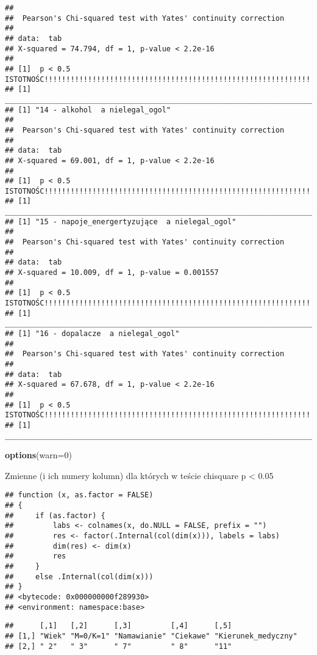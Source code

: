 \documentclass[]{article}
\newenvironment{Shaded}{\begin{snugshade}}{\end{snugshade}}
\newcommand{\KeywordTok}[1]{\textcolor[rgb]{0.13,0.29,0.53}{\textbf{#1}}}
\newcommand{\DataTypeTok}[1]{\textcolor[rgb]{0.13,0.29,0.53}{#1}}
\newcommand{\DecValTok}[1]{\textcolor[rgb]{0.00,0.00,0.81}{#1}}
\newcommand{\NormalTok}[1]{#1}
\begin{document}
\begin{verbatim}
## 
##  Pearson's Chi-squared test with Yates' continuity correction
## 
## data:  tab
## X-squared = 74.794, df = 1, p-value < 2.2e-16
## 
## [1]  p < 0.5 ISTOTNOŚC!!!!!!!!!!!!!!!!!!!!!!!!!!!!!!!!!!!!!!!!!!!!!!!!!!!!!!!!!!!!!!!!
## [1] _______________________________________________________________________________
## [1] "14 - alkohol  a nielegal_ogol"
## 
##  Pearson's Chi-squared test with Yates' continuity correction
## 
## data:  tab
## X-squared = 69.001, df = 1, p-value < 2.2e-16
## 
## [1]  p < 0.5 ISTOTNOŚC!!!!!!!!!!!!!!!!!!!!!!!!!!!!!!!!!!!!!!!!!!!!!!!!!!!!!!!!!!!!!!!!
## [1] _______________________________________________________________________________
## [1] "15 - napoje_energertyzujące  a nielegal_ogol"
## 
##  Pearson's Chi-squared test with Yates' continuity correction
## 
## data:  tab
## X-squared = 10.009, df = 1, p-value = 0.001557
## 
## [1]  p < 0.5 ISTOTNOŚC!!!!!!!!!!!!!!!!!!!!!!!!!!!!!!!!!!!!!!!!!!!!!!!!!!!!!!!!!!!!!!!!
## [1] _______________________________________________________________________________
## [1] "16 - dopalacze  a nielegal_ogol"
## 
##  Pearson's Chi-squared test with Yates' continuity correction
## 
## data:  tab
## X-squared = 67.678, df = 1, p-value < 2.2e-16
## 
## [1]  p < 0.5 ISTOTNOŚC!!!!!!!!!!!!!!!!!!!!!!!!!!!!!!!!!!!!!!!!!!!!!!!!!!!!!!!!!!!!!!!!
## [1] _______________________________________________________________________________
\end{verbatim}

\begin{Shaded}
\begin{Highlighting}[]
\KeywordTok{options}\NormalTok{(}\DataTypeTok{warn=}\DecValTok{0}\NormalTok{)}
\end{Highlighting}
\end{Shaded}

Zmienne (i ich numery kolumn) dla których w teście chisquare p
\textless{} 0.05

\begin{verbatim}
## function (x, as.factor = FALSE) 
## {
##     if (as.factor) {
##         labs <- colnames(x, do.NULL = FALSE, prefix = "")
##         res <- factor(.Internal(col(dim(x))), labels = labs)
##         dim(res) <- dim(x)
##         res
##     }
##     else .Internal(col(dim(x)))
## }
## <bytecode: 0x000000000f289930>
## <environment: namespace:base>
\end{verbatim}

\begin{verbatim}
##      [,1]   [,2]      [,3]         [,4]      [,5]               
## [1,] "Wiek" "M=0/K=1" "Namawianie" "Ciekawe" "Kierunek_medyczny"
## [2,] " 2"   " 3"      " 7"         " 8"      "11"
\end{verbatim}
\end{document}
